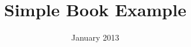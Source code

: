 \documentclass{ecsgdp}
\begin{document}
\title{Simple Book Example} %
\date{January 2013} %

\frontmatter
\maketitle
\tableofcontents
\listingoffigures

\mainmatter

%
%






\backmatter
\end{document}
